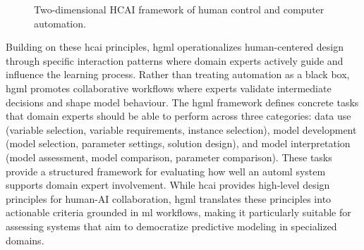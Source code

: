 \documentclass[conference,onecolumn]{IEEEtran}
\begin{document}
\begin{figure}[ht]
\centering
{}
\caption{Two-dimensional HCAI framework of human control and computer automation.}
\label{fig:HCAI_dimensions}
\end{figure}
  
Building on these \gls{hcai} principles, \gls{hgml} \cite{gil2019towards} operationalizes human-centered design through specific interaction patterns where domain experts actively guide and influence the learning process. Rather than treating automation as a black box, \gls{hgml} promotes collaborative workflows where experts validate intermediate decisions and shape model behaviour. The \gls{hgml} framework defines concrete tasks that domain experts should be able to perform across three categories: data use (variable selection, variable requirements, instance selection), model development (model selection, parameter settings, solution design), and model interpretation (model assessment, model comparison, parameter comparison). These tasks provide a structured framework for evaluating how well an \gls{automl} system supports domain expert involvement. While \gls{hcai} provides high-level design principles for human-AI collaboration, \gls{hgml} translates these principles into actionable criteria grounded in \gls{ml} workflows, making it particularly suitable for assessing systems that aim to democratize predictive modeling in specialized domains.
  
\end{document}
